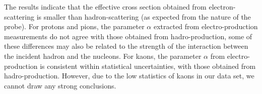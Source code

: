 The results indicate that the effective cross section obtained from electron-scattering is smaller than hadron-scattering (as expected from the nature of the probe). For protons and pions, the parameter $\alpha$ extracted from electro-production measurements do not agree with those obtained from hadro-production, some of these differences may also be related to the strength of the interaction between the incident hadron and the nucleons. For kaons, the parameter $\alpha$ from electro-production is consistent within statistical uncertainties, with those obtained from hadro-production. However, due to the low statistics of kaons in our data set, we cannot draw any strong conclusions.

